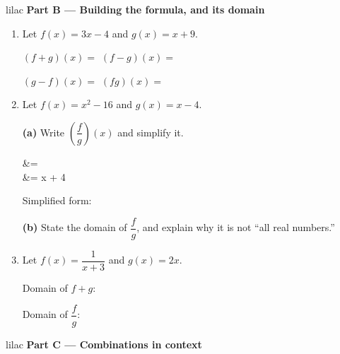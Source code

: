 \documentclass[10pt]{article}
\begin{document}
\vspace{0.1in}

\begin{headlinebox}{lilac}
\textbf{\color{plum}Part B --- Building the formula, and its domain}
\end{headlinebox}

\begin{enumerate}[leftmargin=1.9em, itemsep=8pt, start=3]

\item Let $f(x) = 3x - 4$ and $g(x) = x + 9$.

      $(f+g)(x) = $ \blank{3.0cm} \qquad $(f-g)(x) = $ \blank{3.0cm}

      $(g-f)(x) = $ \blank{3.0cm} \qquad $(fg)(x) = $ \blank{4.0cm}

\item Let $f(x) = x^2 - 16$ and $g(x) = x - 4$.

      \textbf{(a)} Write $\left(\dfrac{f}{g}\right)(x)$ and simplify it.

\begin{work}
   &=  \\
                         &= x + 4
\end{work}

      Simplified form: \blank{3.0cm}

      \textbf{(b)} State the domain of $\dfrac{f}{g}$, and explain why it is not ``all real
      numbers.''
      \writespace{1.2cm}{}

\item Let $f(x) = \dfrac{1}{x + 3}$ and $g(x) = 2x$.

      Domain of $f + g$: \blank{5.4cm}

      Domain of $\dfrac{f}{g}$: \blank{5.4cm}

\end{enumerate}

\newpage

\begin{headlinebox}{lilac}
\textbf{\color{plum}Part C --- Combinations in context}
\end{headlinebox}
\end{document}

